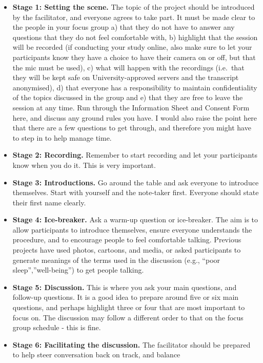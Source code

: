 \documentclass[
  english,
  letterpaper,
  DIV=11,
  numbers=noendperiod]{scrreprt}
\providecommand{\tightlist}{%
  \setlength{\itemsep}{0pt}\setlength{\parskip}{0pt}}
\begin{document}
\begin{itemize}
\tightlist
\item
  \textbf{Stage 1: Setting the scene.} The topic of the project should
  be introduced by the facilitator, and everyone agrees to take part. It
  must be made clear to the people in your focus group a) that they do
  not have to answer any questions that they do not feel comfortable
  with, b) highlight that the session will be recorded (if conducting
  your study online, also make sure to let your participants know they
  have a choice to have their camera on or off, but that the mic must be
  used), c) what will happen with the recordings (i.e.~that they will be
  kept safe on University-approved servers and the transcript
  anonymised), d) that everyone has a responsibility to maintain
  confidentiality of the topics discussed in the group and e) that they
  are free to leave the session at any time. Run through the Information
  Sheet and Consent Form here, and discuss any ground rules you have. I
  would also raise the point here that there are a few questions to get
  through, and therefore you might have to step in to help manage time.
\item
  \textbf{Stage 2: Recording.} Remember to start recording and let your
  participants know when you do it. This is very important.
\item
  \textbf{Stage 3: Introductions.} Go around the table and ask everyone
  to introduce themselves. Start with yourself and the note-taker first.
  Everyone should state their first name clearly.
\item
  \textbf{Stage 4: Ice-breaker.} Ask a warm-up question or ice-breaker.
  The aim is to allow participants to introduce themselves, ensure
  everyone understands the procedure, and to encourage people to feel
  comfortable talking. Previous projects have used photos, cartoons, and
  media, or asked participants to generate meanings of the terms used in
  the discussion (e.g., ``poor sleep'',''well-being'') to get people
  talking.
\item
  \textbf{Stage 5: Discussion.} This is where you ask your main
  questions, and follow-up questions. It is a good idea to prepare
  around five or six main questions, and perhaps highlight three or four
  that are most important to focus on. The discussion may follow a
  different order to that on the focus group schedule - this is fine.
\item
  \textbf{Stage 6: Facilitating the discussion.} The facilitator should
  be prepared to help steer conversation back on track, and balance

\end{itemize}
\end{document}
